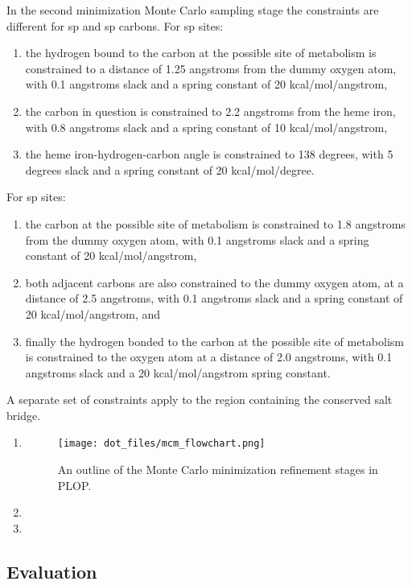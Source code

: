 In the second minimization Monte Carlo sampling stage the constraints are different for sp and sp carbons.
For sp sites:
\begin{enumerate}
\item the hydrogen bound to the carbon at the possible site of metabolism is constrained to a distance of 1.25 angstroms from the dummy oxygen atom, with 0.1 angstroms slack and a spring constant of 20 kcal/mol/angstrom,
\item the carbon in question is constrained to 2.2 angstroms from the heme iron, with 0.8 angstroms slack and a spring constant of 10 kcal/mol/angstrom,
\item the heme iron-hydrogen-carbon angle is constrained to 138 degrees, with 5 degrees slack and a spring constant of 20 kcal/mol/degree.
\end{enumerate}
For sp sites:
\begin{enumerate}
\item the carbon at the possible site of metabolism is constrained to 1.8 angstroms from the dummy oxygen atom, with 0.1 angstroms slack and a spring constant of 20 kcal/mol/angstrom,
\item both adjacent carbons are also constrained to the dummy oxygen atom, at a distance of 2.5 angstroms, with 0.1 angstroms slack and a spring constant of 20 kcal/mol/angstrom, and
\item finally the hydrogen bonded to the carbon at the possible site of metabolism is constrained to the oxygen atom at a distance of 2.0 angstroms, with 0.1 angstroms slack and a 20 kcal/mol/angstrom spring constant.
\end{enumerate}

A separate set of constraints apply to the region containing the conserved salt bridge.

\begin{enumerate}
\item 
\begin{figure}[hp]
\centering
\texttt{[image: dot\_files/mcm\_flowchart.png]}
\caption{An outline of the Monte Carlo minimization refinement stages in PLOP.}
\label{figure:mcm_flowchart}
\end{figure}
\item 
\item 
\end{enumerate}

\subsection{Evaluation}
\label{subsection:p450/evaluation}

